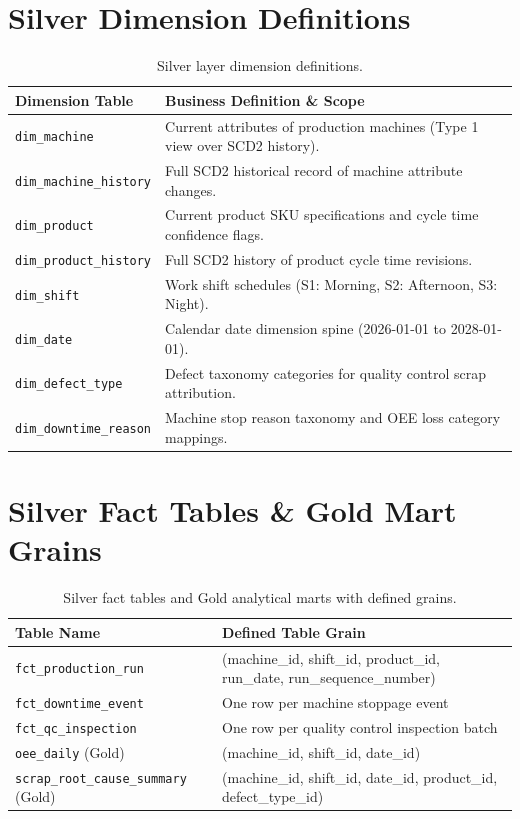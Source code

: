 \documentclass[12pt, a4paper]{report}
\begin{document}
\section{Silver Dimension Definitions}
\begin{table}[h]
\centering
\begin{tabularx}{\textwidth}{l X}
\toprule
\textbf{\color{primary}Dimension Table} & \textbf{\color{primary}Business Definition \& Scope} \\
\midrule
\texttt{dim\_machine} & Current attributes of production machines (Type 1 view over SCD2 history). \\
\texttt{dim\_machine\_history} & Full SCD2 historical record of machine attribute changes. \\
\texttt{dim\_product} & Current product SKU specifications and cycle time confidence flags. \\
\texttt{dim\_product\_history} & Full SCD2 history of product cycle time revisions. \\
\texttt{dim\_shift} & Work shift schedules (S1: Morning, S2: Afternoon, S3: Night). \\
\texttt{dim\_date} & Calendar date dimension spine (2026-01-01 to 2028-01-01). \\
\texttt{dim\_defect\_type} & Defect taxonomy categories for quality control scrap attribution. \\
\texttt{dim\_downtime\_reason} & Machine stop reason taxonomy and OEE loss category mappings. \\
\bottomrule
\end{tabularx}
\caption{Silver layer dimension definitions.}
\label{tab:dims}
\end{table}

\section{Silver Fact Tables \& Gold Mart Grains}
\begin{table}[h]
\centering
\begin{tabularx}{\textwidth}{l X}
\toprule
\textbf{\color{primary}Table Name} & \textbf{\color{primary}Defined Table Grain} \\
\midrule
\texttt{fct\_production\_run} & (machine\_id, shift\_id, product\_id, run\_date, run\_sequence\_number) \\
\texttt{fct\_downtime\_event} & One row per machine stoppage event \\
\texttt{fct\_qc\_inspection} & One row per quality control inspection batch \\
\texttt{oee\_daily} (Gold) & (machine\_id, shift\_id, date\_id) \\
\texttt{scrap\_root\_cause\_summary} (Gold) & (machine\_id, shift\_id, date\_id, product\_id, defect\_type\_id) \\
\bottomrule
\end{tabularx}
\caption{Silver fact tables and Gold analytical marts with defined grains.}
\label{tab:facts-gold}
\end{table}
\end{document}
